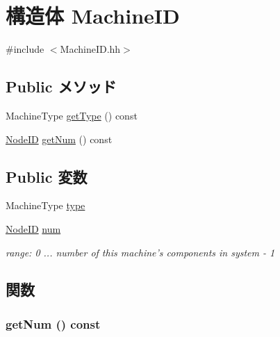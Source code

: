 \hypertarget{structMachineID}{
\section{構造体 MachineID}
\label{structMachineID}
}


{\ttfamily \#include $<$MachineID.hh$>$}\subsection*{Public メソッド}
\begin{DoxyCompactItemize}
\item 
MachineType \hyperlink{structMachineID_a3979ddfd39fd9b22e4bb58bb0ff50726}{getType} () const 
\item 
\hyperlink{TypeDefines_8hh_a83c14b4ae37e80071f6b3506a6c46151}{NodeID} \hyperlink{structMachineID_a2677f023318d0c72e14ba5dd0c29cb85}{getNum} () const 
\end{DoxyCompactItemize}
\subsection*{Public 変数}
\begin{DoxyCompactItemize}
\item 
MachineType \hyperlink{structMachineID_a47a4e8abb3f6f594e1bfdaf611bc62ab}{type}
\item 
\hyperlink{TypeDefines_8hh_a83c14b4ae37e80071f6b3506a6c46151}{NodeID} \hyperlink{structMachineID_a94f95f94fc2a995609dafb041ae268ad}{num}
\begin{DoxyCompactList}\small\item\em range: 0 ... number of this machine's components in system -\/ 1 \item\end{DoxyCompactList}\end{DoxyCompactItemize}


\subsection{関数}
\hypertarget{structMachineID_a2677f023318d0c72e14ba5dd0c29cb85}{
\subsubsection[{getNum}]{ getNum () const}}
\label{structMachineID_a2677f023318d0c72e14ba5dd0c29cb85}



